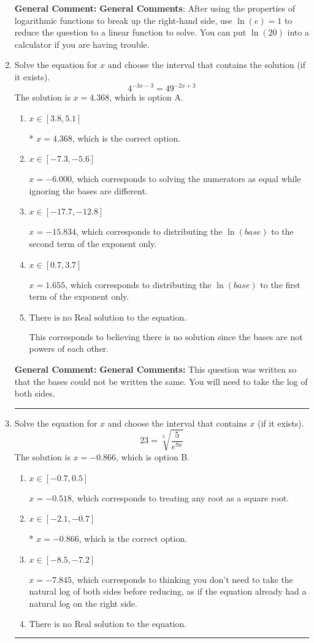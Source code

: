 \documentclass{extbook}[14pt]
\newcommand{\litem}[1]{\item #1

\rule{\textwidth}{0.4pt}}
\begin{document}
\begin{enumerate}
{\textbf{General Comment:} \textbf{General Comments}: After using the properties of logarithmic functions to break up the right-hand side, use $\ln(e) = 1$ to reduce the question to a linear function to solve. You can put $\ln(20)$ into a calculator if you are having trouble.
}
\litem{
Solve the equation for $x$ and choose the interval that contains the solution (if it exists).
\[ 4^{-3x-3} = 49^{-2x+3} \]The solution is \( x = 4.368 \), which is option A.\begin{enumerate}[label=\Alph*.]
\item \( x \in [3.8, 5.1] \)

* $x = 4.368$, which is the correct option.
\item \( x \in [-7.3, -5.6] \)

$x = -6.000$, which corresponds to solving the numerators as equal while ignoring the bases are different.
\item \( x \in [-17.7, -12.8] \)

$x = -15.834$, which corresponds to distributing the $\ln(base)$ to the second term of the exponent only.
\item \( x \in [0.7, 3.7] \)

$x = 1.655$, which corresponds to distributing the $\ln(base)$ to the first term of the exponent only.
\item \( \text{There is no Real solution to the equation.} \)

This corresponds to believing there is no solution since the bases are not powers of each other.
\end{enumerate}

\textbf{General Comment:} \textbf{General Comments:} This question was written so that the bases could not be written the same. You will need to take the log of both sides.
}
\litem{
 Solve the equation for $x$ and choose the interval that contains $x$ (if it exists).
\[  23 = \sqrt[3]{\frac{5}{e^{9x}}} \]The solution is \( x = -0.866 \), which is option B.\begin{enumerate}[label=\Alph*.]
\item \( x \in [-0.7, 0.5] \)

$x = -0.518$, which corresponds to treating any root as a square root.
\item \( x \in [-2.1, -0.7] \)

* $x = -0.866$, which is the correct option.
\item \( x \in [-8.5, -7.2] \)

$x = -7.845$, which corresponds to thinking you don't need to take the natural log of both sides before reducing, as if the equation already had a natural log on the right side.
\item \( \text{There is no Real solution to the equation.} \)


\end{enumerate}}
\end{enumerate}
\end{document}
